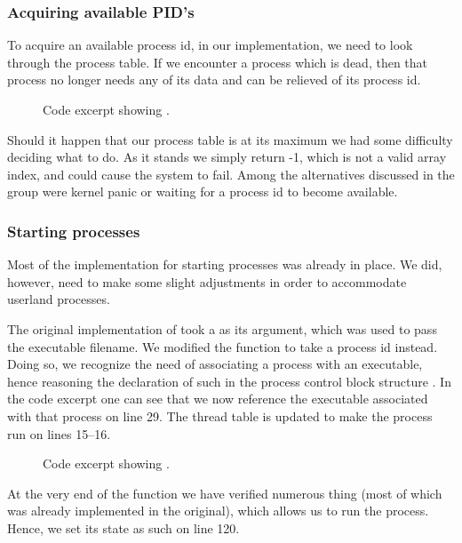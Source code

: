 {\subsubsection{Acquiring available PID's}
To acquire an available process id, in our implementation, we need to look
through the process table. If we encounter a process which is dead, then that
process no longer needs any of its data and can be relieved of its process id.
\begin{figure}[H]
    
    \caption{Code excerpt showing .}
    \label{code:process_get_available_pid}
\end{figure}
Should it happen that our process table is at its maximum we had some
difficulty deciding what to do. As it stands we simply return -1, which is not
a valid array index, and could cause the system to fail. Among the
alternatives discussed in the group were kernel panic or waiting for a process
id to become available.


\subsubsection{Starting processes}
Most of the implementation for starting processes was already in place. We
did, however, need to make some slight adjustments in order to accommodate
userland processes.

The original implementation of  took a  as its argument, which was used to pass the executable filename. We
modified the function to take a process id instead. Doing so, we recognize the
need of associating a process with an executable, hence reasoning the
declaration of such in the process control block structure
. In the code excerpt one can see that we
now reference the executable associated with that process on line 29. The
thread table is updated to make the process run on lines 15--16.

\begin{figure}[H]
    
    \vspace{-0.25in}\center{\dots}
    
    \vspace{-0.25in}\center{\dots}
    
    \caption{Code excerpt showing .}
    \label{code:process_start}
\end{figure}
At the very end of the  function we have verified
numerous thing (most of which was already implemented in the original), which
allows us to run the process. Hence, we set its state as such on line 120.

}
